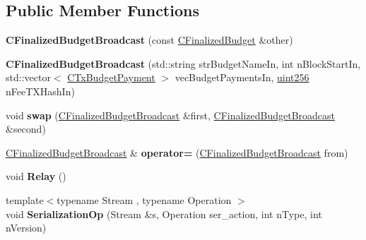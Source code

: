 \subsection*{Public Member Functions}
\begin{DoxyCompactItemize}
\item 
\mbox{\label{class_c_finalized_budget_broadcast_a0fc9903afc9a1ccfc7008f0bb95ba26e}} 
{\bfseries C\+Finalized\+Budget\+Broadcast} (const \mbox{\hyperlink{class_c_finalized_budget}{C\+Finalized\+Budget}} \&other)
\item 
\mbox{\label{class_c_finalized_budget_broadcast_a800780793836750ec3c848e87fb397a7}} 
{\bfseries C\+Finalized\+Budget\+Broadcast} (std\+::string str\+Budget\+Name\+In, int n\+Block\+Start\+In, std\+::vector$<$ \mbox{\hyperlink{class_c_tx_budget_payment}{C\+Tx\+Budget\+Payment}} $>$ vec\+Budget\+Payments\+In, \mbox{\hyperlink{classuint256}{uint256}} n\+Fee\+T\+X\+Hash\+In)
\item 
\mbox{\label{class_c_finalized_budget_broadcast_ac9e99f471d82a9c2d76137a758740315}} 
void {\bfseries swap} (\mbox{\hyperlink{class_c_finalized_budget_broadcast}{C\+Finalized\+Budget\+Broadcast}} \&first, \mbox{\hyperlink{class_c_finalized_budget_broadcast}{C\+Finalized\+Budget\+Broadcast}} \&second)
\item 
\mbox{\label{class_c_finalized_budget_broadcast_afccbdda2d00c695c63802db0fda2d489}} 
\mbox{\hyperlink{class_c_finalized_budget_broadcast}{C\+Finalized\+Budget\+Broadcast}} \& {\bfseries operator=} (\mbox{\hyperlink{class_c_finalized_budget_broadcast}{C\+Finalized\+Budget\+Broadcast}} from)
\item 
\mbox{\label{class_c_finalized_budget_broadcast_abb4cfac3327e7cb912b368054d23fc9c}} 
void {\bfseries Relay} ()
\item 
\mbox{\label{class_c_finalized_budget_broadcast_a2c9bac4bb653dbae4c3861fd12380dcd}} 
{\footnotesize template$<$typename Stream , typename Operation $>$ }\\void {\bfseries Serialization\+Op} (Stream \&s, Operation ser\+\_\+action, int n\+Type, int n\+Version)
\end{DoxyCompactItemize}
